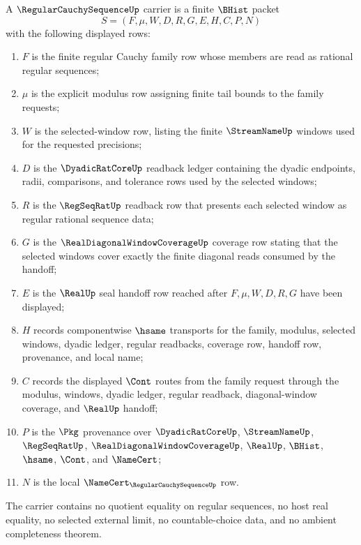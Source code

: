 \begin{definition}
\label{def:regular-cauchy-sequence-carrier}
A $\RegularCauchySequenceUp$ carrier is a finite $\BHist$ packet
$$
S=(F,\mu,W,D,R,G,E,H,C,P,N)
$$
with the following displayed rows:
\begin{enumerate}
\item $F$ is the finite regular Cauchy family row whose members are read as rational regular sequences;
\item $\mu$ is the explicit modulus row assigning finite tail bounds to the family requests;
\item $W$ is the selected-window row, listing the finite $\StreamNameUp$ windows used for the requested precisions;
\item $D$ is the $\DyadicRatCoreUp$ readback ledger containing the dyadic endpoints, radii, comparisons, and tolerance rows used by the selected windows;
\item $R$ is the $\RegSeqRatUp$ readback row that presents each selected window as regular rational sequence data;
\item $G$ is the $\RealDiagonalWindowCoverageUp$ coverage row stating that the selected windows cover exactly the finite diagonal reads consumed by the handoff;
\item $E$ is the $\RealUp$ seal handoff row reached after $F,\mu,W,D,R,G$ have been displayed;
\item $H$ records componentwise $\hsame$ transports for the family, modulus, selected windows, dyadic ledger, regular readbacks, coverage row, handoff row, provenance, and local name;
\item $C$ records the displayed $\Cont$ routes from the family request through the modulus, windows, dyadic ledger, regular readback, diagonal-window coverage, and $\RealUp$ handoff;
\item $P$ is the $\Pkg$ provenance over $\DyadicRatCoreUp$, $\StreamNameUp$, $\RegSeqRatUp$, $\RealDiagonalWindowCoverageUp$, $\RealUp$, $\BHist$, $\hsame$, $\Cont$, and $\NameCert$;
\item $N$ is the local $\NameCert_{\RegularCauchySequenceUp}$ row.
\end{enumerate}
The carrier contains no quotient equality on regular sequences, no host real equality, no selected external limit, no countable-choice data, and no ambient completeness theorem.
\end{definition}

